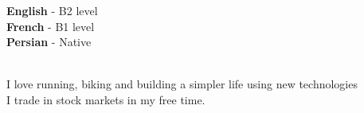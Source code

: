 \begin{minipage}[t]{0.45\textwidth}
    \vspace{-\baselineskip} %


    \textbf{English} - B2 level\\
    \textbf{French} - B1 level\\
    \textbf{Persian} - Native\\\
\end{minipage}
\hfill
\begin{minipage}[t]{0.45\textwidth}
    \vspace{-\baselineskip} %


    I love running, biking and building a simpler life using new technologies\\
    I trade in stock markets in my free time.
\end{minipage}

